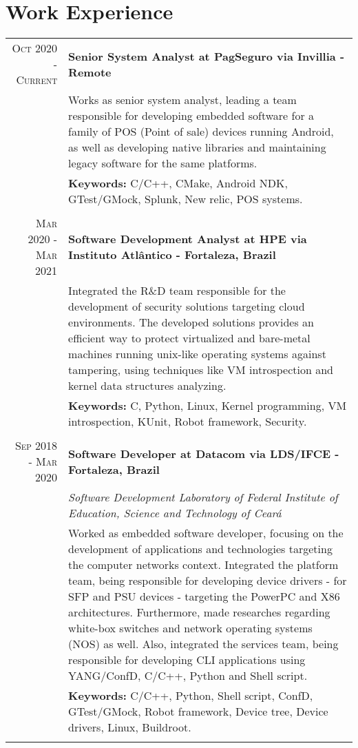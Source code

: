 \documentclass[a4paper,10pt]{article}
\begin{document}
\section{Work Experience}
\begin{tabular}{r|p{11cm}}

  \textsc{Oct 2020 - Current} &\textbf{Senior System Analyst at PagSeguro via Invillia - Remote} \\&\footnotesize{Works as senior system analyst, leading a team responsible for developing embedded software for a family of POS (Point of sale) devices running Android, as well as developing native libraries and maintaining legacy software for the same platforms.}
  \\ & \footnotesize{\textbf{Keywords:} C/C++, CMake, Android NDK, GTest/GMock, Splunk, New relic, POS systems.}
  \\\multicolumn{2}{c}{} \\

  \textsc{Mar 2020 - Mar 2021} &\textbf{Software Development Analyst at HPE via Instituto Atlântico - Fortaleza, Brazil} \\&\footnotesize{Integrated the R\&D team responsible for the development of security solutions targeting cloud environments. The developed solutions provides an efficient way to protect virtualized and bare-metal machines running unix-like operating systems against tampering, using techniques like VM introspection and kernel data structures analyzing.}
  \\ & \footnotesize{\textbf{Keywords:} C, Python, Linux, Kernel programming, VM introspection, KUnit, Robot framework, Security.}
  \\\multicolumn{2}{c}{} \\

  \textsc{Sep 2018 - Mar 2020} &\textbf{Software Developer at Datacom via LDS/IFCE - Fortaleza, Brazil} \\&\emph{Software Development Laboratory of Federal Institute of Education, Science
  and Technology of Ceará}\\&\footnotesize{Worked as embedded software developer, focusing on the development of applications and technologies targeting the computer networks context. Integrated the platform team, being responsible for developing device drivers - for SFP and PSU devices - targeting the PowerPC and X86 architectures. Furthermore,  made researches regarding white-box switches and network operating systems (NOS) as well.
  Also, integrated the services team, being responsible for developing CLI applications using YANG/ConfD, C/C++, Python and Shell script.}
  \\ & \footnotesize{\textbf{Keywords:} C/C++, Python, Shell script, ConfD,  GTest/GMock, Robot framework, Device tree, Device drivers, Linux, Buildroot.}
  \\\multicolumn{2}{c}{} \\


\end{tabular}
\end{document}
